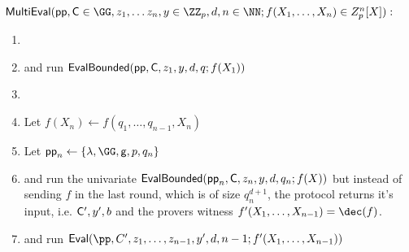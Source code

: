\documentclass{article}
\theoremstyle{definition}
\begin{document}
 \begin{mdframed}
\begin{minipage}{\textwidth}
			$\pro{MultiEval}(\crs, \gr{C}\in \GG, z_1,\dots z_n,y \in \ZZ_p, d,n \in \NN; f(X_1,\dots,X_n)\in Z_p^n[X]) :$ 			\begin{enumerate}[nolistsep]
			\item {} 
			\item \pcind[1] \prover and \verifier run $\textsf{{EvalBounded}}(\textsf{pp},\mathsf{C},z_1,y,d,q;f(X_1))$ 
			\item \pcelse
			\item \pcind[1] Let $f(X_n)\gets f(q_1,\dots,q_{n-1},X_n)$
			\item \pcind[1] Let $\crs_n \gets \{\lambda,\GG,\gr{g},p,q_n\}$
			\item \pcind[1] \prover and \verifier run the univariate $\textsf{{EvalBounded}}(\textsf{pp}_n,\mathsf{C},z_n,y,d,q_n;f(X))$ but instead of sending $f$ in the last round, which is of size $q_n^{d+1}$, the protocol returns it's input, i.e. $\mathsf{C}',y',b$ and the provers witness $f'(X_1,\dots,X_{n-1})=\dec(f)$.
			\item \pcind[1]\prover and \verifier run $\eval(\pp,C',z_1,\dots,z_{n-1},y',d,n-1;f'(X_1,\dots,X_{n-1}))$
		    \end{enumerate}
      \end{minipage}
\end{mdframed}

 
 
\end{document}
